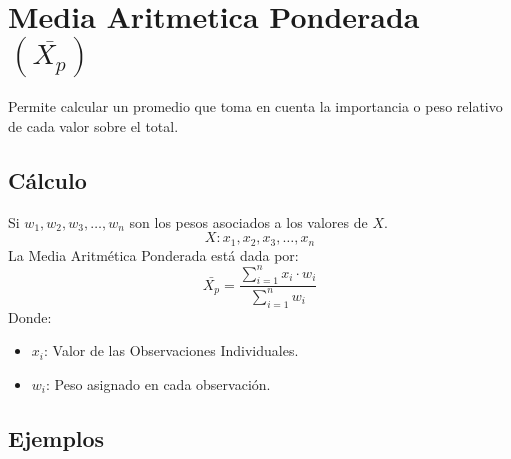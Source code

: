 \section{Media Aritmetica Ponderada $(\overline{X_p})$}
Permite calcular un promedio que toma en cuenta la importancia o peso relativo de cada valor sobre el total.
\subsection{Cálculo}
Si $w_1,w_2,w_3, \ldots ,w_n$ son los pesos asociados a los valores de $X$.
$$X:x_1,x_2,x_3,\ldots,x_n$$
La Media Aritmética Ponderada está dada por:
$$\bar{X_p}=\dfrac{\displaystyle\sum_{i=1}^{n}x_i\cdot w_i}{\displaystyle\sum_{i=1}^{n}w_i}$$
Donde:
\begin{itemize}
\item $x_i$: Valor de las Observaciones Individuales.
\item $w_i$: Peso asignado en cada observación.
\end{itemize}
\subsection{Ejemplos}